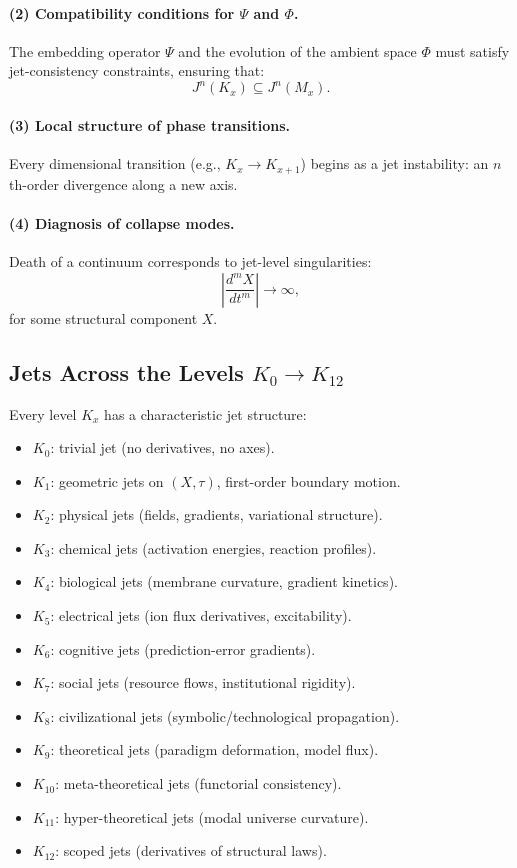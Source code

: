 \paragraph{(2) Compatibility conditions for \texorpdfstring{$\Psi$}{\Psi} and \texorpdfstring{$\Phi$}{\Phi}.}
The embedding operator $\Psi$ and the evolution of the ambient space
$\Phi$ must satisfy jet-consistency constraints, ensuring that:
\[
J^n(K_x) \subseteq J^n(M_x).
\]

\paragraph{(3) Local structure of phase transitions.}
Every dimensional transition (e.g., $K_{x} \to K_{x+1}$) begins as a
jet instability: an $n$th-order divergence along a new axis.

\paragraph{(4) Diagnosis of collapse modes.}
Death of a continuum corresponds to jet-level singularities:
\[
\left| \frac{d^m X}{dt^m} \right| \to \infty,
\]
for some structural component $X$.



\subsection{Jets Across the Levels $K_0 \to K_{12}$}

Every level $K_x$ has a characteristic jet structure:

\begin{itemize}
    \item $K_0$: trivial jet (no derivatives, no axes).
    \item $K_1$: geometric jets on $(X,\tau)$, first-order boundary motion.
    \item $K_2$: physical jets (fields, gradients, variational structure).
    \item $K_3$: chemical jets (activation energies, reaction profiles).
    \item $K_4$: biological jets (membrane curvature, gradient kinetics).
    \item $K_5$: electrical jets (ion flux derivatives, excitability).
    \item $K_6$: cognitive jets (prediction-error gradients).
    \item $K_7$: social jets (resource flows, institutional rigidity).
    \item $K_8$: civilizational jets (symbolic/technological propagation).
    \item $K_9$: theoretical jets (paradigm deformation, model flux).
    \item $K_{10}$: meta-theoretical jets (functorial consistency).
    \item $K_{11}$: hyper-theoretical jets (modal universe curvature).
    \item $K_{12}$: scoped jets (derivatives of structural laws).
\end{itemize}

